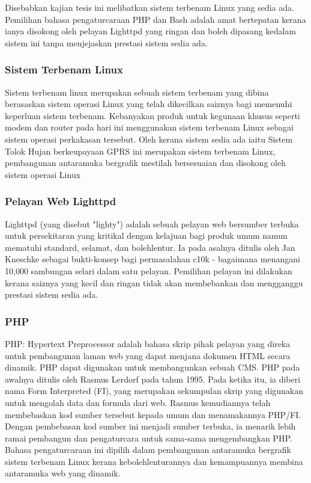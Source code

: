 Disebabkan kajian tesis ini melibatkan sistem terbenam Linux yang sedia ada. Pemilihan bahasa pengaturcaraan PHP dan Bash adalah amat bertepatan kerana ianya disokong oleh pelayan Lighttpd yang ringan dan boleh dipasang kedalam sistem ini tanpa menjejaskan prestasi sistem sedia ada. 

\subsubsection{Sistem Terbenam Linux}
Sistem terbenam linux merupakan sebuah sistem terbenam yang dibina berasaskan sistem operasi Linux yang telah dikecilkan saiznya bagi memenuhi keperluan sistem terbenam. Kebanyakan produk untuk kegunaan khusus seperti modem dan router pada hari ini menggunakan sistem terbenam Linux sebagai sistem operasi perkakasan tersebut. Oleh kerana sistem sedia ada iaitu Sistem Tolok Hujan berkeupayaan GPRS ini merupakan sistem terbenam Linux, pembangunan antaramuka bergrafik mestilah bersesuaian dan disokong oleh sistem operasi Linux

\subsubsection{Pelayan Web Lighttpd}
Lighttpd (yang disebut "lighty") adalah sebuah pelayan web bersumber terbuka untuk persekitaran yang kritikal dengan kelajuan bagi produk umum namun mematuhi standard, selamat, dan bolehlentur. Ia pada asalnya ditulis oleh   Jan Kneschke sebagai bukti-konsep bagi permasalahan c10k - bagaimana menangani 10,000 sambungan selari dalam satu pelayan. Pemilihan pelayan ini dilakukan kerana saiznya yang kecil dan ringan tidak akan membebankan dan mengganggu prestasi sistem sedia ada.

\subsubsection{PHP}
PHP: Hypertext Preprocessor adalah bahasa skrip pihak pelayan yang direka untuk pembangunan laman web yang dapat menjana dokumen \ac{HTML} secara dinamik. PHP dapat digunakan untuk membangunkan sebuah CMS. PHP pada awalnya ditulis oleh Rasmus Lerdorf pada tahun 1995. Pada ketika itu, ia diberi nama Form Interpreted (FI), yang merupakan sekumpulan skrip yang digunakan untuk mengolah data dan formula dari web. Rasmus kemudiannya telah membebaskan kod sumber tersebut kepada umum dan menamakannya PHP/FI. Dengan pembebasan kod sumber ini menjadi sumber terbuka, ia menarik lebih ramai pembangun dan pengaturcara untuk sama-sama mengembangkan PHP. Bahasa pengaturcaraan ini dipilih dalam pembangunan antaramuka bergrafik sistem terbenam Linux kerana kebolehlenturannya dan kemampuannya membina antaramuka web yang dinamik.

